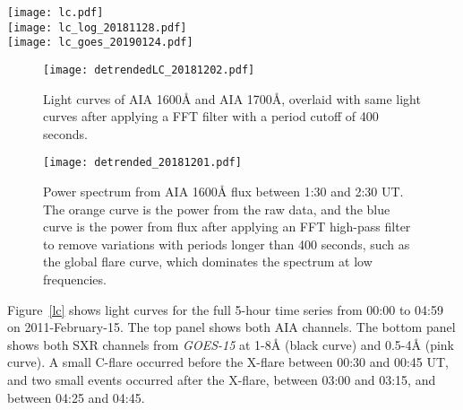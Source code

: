 \clearpage
\begin{figure*}[htb!]\centering
    \texttt{[image: lc.pdf]}\\
    \texttt{[image: lc\_log\_20181128.pdf]}\\
    \texttt{[image: lc\_goes\_20190124.pdf]}
    \caption{%
        Top: Light curves of the
        UV continuum emission from AIA 1600\AA{} (blue curve) and
        AIA 1700\AA{} (red curve),
        integrated over the flare region in AR 11158.
        Middle: Same as top, but scaled as log(flux).
        Bottom: Light curves from \textit{GOES-15}
        channels 1-8\AA{} (black curve) and 0.5-4\AA{} (pink curve),
        scaled as log(flux) to enable visibility of the increases
        during smaller events before and
        after the main X-flare.
        \label{lc}}
\end{figure*}


\clearpage
\begin{figure}[htb!]\centering
    \texttt{[image: detrendedLC\_20181202.pdf]}
    \caption{%
        Light curves of AIA 1600\AA{} and AIA 1700\AA{}, overlaid with
        same light curves after applying a FFT filter with a period
        cutoff of 400 seconds.
    \label{detrended}}
\end{figure}


\begin{figure}[htb!]\centering
    \texttt{[image: detrended\_20181201.pdf]}
    \caption{%
        Power spectrum from
        AIA 1600\AA{} flux between 1:30 and 2:30 UT.
        The orange curve is the power from the raw data, and the blue
        curve is the power from flux after applying an FFT high-pass filter
        to remove variations with periods longer than 400 seconds,
        such as the global flare curve, which dominates the spectrum at
        low frequencies.
    \label{detrended}}
\end{figure}

Figure~\ref{lc} shows light curves for the full 5-hour time series
from 00:00 to 04:59 on 2011-February-15.
The top panel shows both AIA channels.
The bottom panel shows both SXR channels from \textit{GOES-15} at
1-8\AA{} (black curve) and 0.5-4\AA{} (pink curve).
A small C-flare occurred before the X-flare between 00:30 and 00:45 UT, and
two small events occurred after the X-flare,
between 03:00 and 03:15, and between 04:25 and 04:45.


